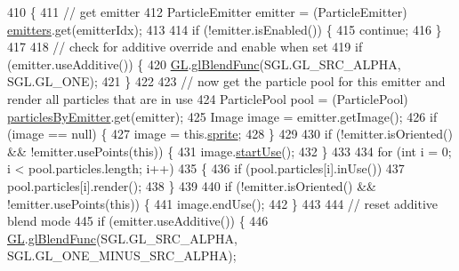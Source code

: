\begin{DoxyCode}
410         \{
411             \textcolor{comment}{// get emitter}
412             ParticleEmitter emitter = (ParticleEmitter) \mbox{\hyperlink{classorg_1_1newdawn_1_1slick_1_1particles_1_1_particle_system_aee956700fc1881201435275fdd6fc32b}{emitters}}.get(emitterIdx);
413             
414             \textcolor{keywordflow}{if} (!emitter.isEnabled()) \{
415                 \textcolor{keywordflow}{continue};
416             \}
417             
418             \textcolor{comment}{// check for additive override and enable when set}
419             \textcolor{keywordflow}{if} (emitter.useAdditive()) \{
420                 \mbox{\hyperlink{classorg_1_1newdawn_1_1slick_1_1particles_1_1_particle_system_a85c7b91571a1ae49fd4887ede1ca318a}{GL}}.\mbox{\hyperlink{interfaceorg_1_1newdawn_1_1slick_1_1opengl_1_1renderer_1_1_s_g_l_afa605b9f35a519c10dbed88c79be96af}{glBlendFunc}}(SGL.GL\_SRC\_ALPHA, SGL.GL\_ONE);
421             \}
422             
423             \textcolor{comment}{// now get the particle pool for this emitter and render all particles that are in use}
424             ParticlePool pool = (ParticlePool) \mbox{\hyperlink{classorg_1_1newdawn_1_1slick_1_1particles_1_1_particle_system_aec10bb63c0065ee17c8d8133936f5db6}{particlesByEmitter}}.get(emitter);
425             Image image = emitter.getImage();
426             \textcolor{keywordflow}{if} (image == null) \{
427                 image = this.\mbox{\hyperlink{classorg_1_1newdawn_1_1slick_1_1particles_1_1_particle_system_a42359ac9175deb095eaa520263e352da}{sprite}};
428             \}
429             
430             \textcolor{keywordflow}{if} (!emitter.isOriented() && !emitter.usePoints(\textcolor{keyword}{this})) \{
431                 image.\mbox{\hyperlink{classorg_1_1newdawn_1_1slick_1_1_image_a6c7c3f31d0a0a4c73026c8dac8dec7d2}{startUse}}();
432             \}
433             
434             \textcolor{keywordflow}{for} (\textcolor{keywordtype}{int} i = 0; i < pool.particles.length; i++)
435             \{
436                 \textcolor{keywordflow}{if} (pool.particles[i].inUse())
437                     pool.particles[i].render();
438             \} 
439             
440             \textcolor{keywordflow}{if} (!emitter.isOriented() && !emitter.usePoints(\textcolor{keyword}{this})) \{
441                 image.endUse();
442             \}
443 
444             \textcolor{comment}{// reset additive blend mode}
445             \textcolor{keywordflow}{if} (emitter.useAdditive()) \{
446                 \mbox{\hyperlink{classorg_1_1newdawn_1_1slick_1_1particles_1_1_particle_system_a85c7b91571a1ae49fd4887ede1ca318a}{GL}}.\mbox{\hyperlink{interfaceorg_1_1newdawn_1_1slick_1_1opengl_1_1renderer_1_1_s_g_l_afa605b9f35a519c10dbed88c79be96af}{glBlendFunc}}(SGL.GL\_SRC\_ALPHA, SGL.GL\_ONE\_MINUS\_SRC\_ALPHA);

\end{DoxyCode}
